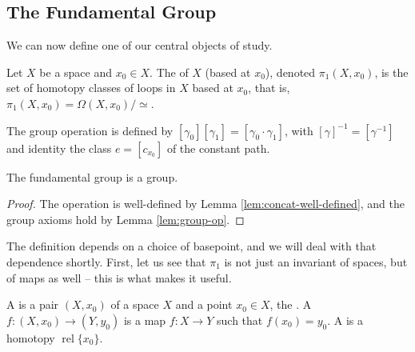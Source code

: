 \documentclass[a4paper]{scrartcl}
\newcommand{\rel}{\operatorname{rel}}
\begin{document}
\subsection{The Fundamental Group}

We can now define one of our central objects of study.

\begin{definition}
	Let $X$ be a space and $x_0 \in X$. The  of $X$ (based at $x_0$), denoted $\pi_1(X, x_0)$, is the set of homotopy classes of loops in $X$ based at $x_0$, that is, $\pi_1(X, x_0) = \Omega(X, x_0)/\simeq$.

	The group operation is defined by $[\gamma_0][\gamma_1] = [\gamma_0 \cdot \gamma_1]$, with $[\gamma]^{-1} = [\gamma^{-1}]$ and identity the class $e = [c_{x_0}]$ of the constant path.
\end{definition}

\begin{theorem}
	The fundamental group is a group.
\end{theorem}
\begin{proof}
	The operation is well-defined by Lemma \ref{lem:concat-well-defined}, and the group axioms hold by Lemma \ref{lem:group-op}.
\end{proof}

The definition depends on a choice of basepoint, and we will deal with that dependence
shortly. First, let us see that $\pi_1$ is not just an invariant of spaces, but of maps
as well -- this is what makes it useful.

\begin{definition}
	A  is a pair $(X, x_0)$ of a space $X$ and a point $x_0 \in X$, the . A  $f: (X, x_0) \rightarrow (Y, y_0)$ is a map $f: X \rightarrow Y$ such that $f(x_0) = y_0$. A  is a homotopy $\rel \{x_0\}$.
\end{definition}
\end{document}

